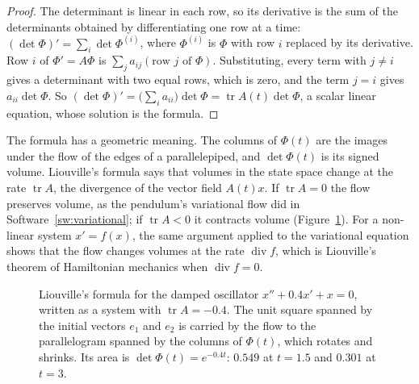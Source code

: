 \documentclass[11pt,a4paper]{article}
\numberwithin{equation}{section}
\DeclareMathOperator{\tr}{tr}
\theoremstyle{definition}
\begin{document}
\begin{proof}
The determinant is linear in each row, so its derivative is the sum of the determinants obtained by differentiating one row at a time:
$(\det\Phi)' = \sum_i\det\Phi^{(i)}$, where $\Phi^{(i)}$ is $\Phi$ with row $i$ replaced by its derivative. Row $i$ of $\Phi' = A\Phi$ is $\sum_ja_{ij}(\text{row } j \text{ of } \Phi)$. Substituting, every term with $j \neq i$
gives a determinant with two equal rows, which is zero, and the term $j = i$ gives $a_{ii}\det\Phi$. So $(\det\Phi)' = \bigl(\sum_ia_{ii}\bigr)\det\Phi = \tr A(t)\det\Phi$, a scalar linear equation, whose solution is
the formula.
\end{proof}

The formula has a geometric meaning. The columns of $\Phi(t)$ are the images under the flow of the edges of a parallelepiped, and $\det\Phi(t)$ is its signed volume. Liouville's
formula says that volumes in the state space change at the rate $\tr A$, the divergence of the vector field $A(t)x$. If $\tr A = 0$ the flow preserves volume, as the pendulum's
variational flow did in Software~\ref{sw:variational}; if $\tr A < 0$ it contracts volume (Figure~\ref{fig:liouville}). For a non-linear system $x' = f(x)$, the same argument applied to the
variational equation shows that the flow changes volumes at the rate $\operatorname{div} f$, which is Liouville's theorem of Hamiltonian mechanics when $\operatorname{div} f = 0$.

\begin{figure}[H]
\centering
{}
\caption{Liouville's formula for the damped oscillator $x'' + 0.4x' + x = 0$, written as a system with $\tr A = -0.4$. The unit square spanned by the initial vectors $e_1$ and $e_2$ is carried
by the flow to the parallelogram spanned by the columns of $\Phi(t)$, which rotates and shrinks. Its area is $\det\Phi(t) = e^{-0.4t}$: $0.549$ at $t = 1.5$ and $0.301$ at $t = 3$.}
\label{fig:liouville}
\end{figure}
\end{document}
